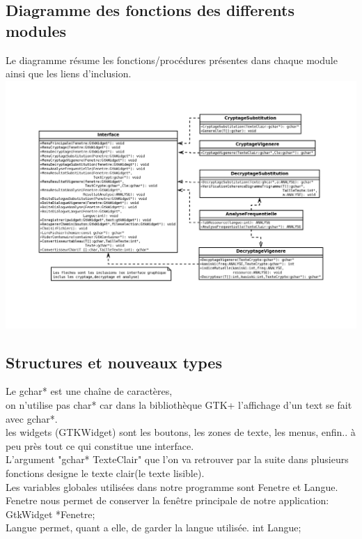 \documentclass[a4]{article}
\begin{document}
		\subsection{Diagramme des fonctions des differents modules}
								Le diagramme résume les fonctions/procédures présentes dans chaque module ainsi que les liens d'inclusion.\\

		\includegraphics[scale=0.8]{diaa.jpg}
		\subsection{Structures et nouveaux types}
		Le gchar* est une chaîne de caractères,\\ on n'utilise pas char* car dans la bibliothèque
		GTK+ l'affichage d'un text se fait avec gchar*.\\
		
		les widgets (GTKWidget) sont les boutons, les zones de texte, les menus, enfin.. à peu 
		près tout ce qui constitue une interface.\\
		
		L'argument "gchar* TexteClair" que l'on va retrouver par la suite dans plusieurs fonctions
		designe le texte clair(le texte lisible).\\
		
		Les variables globales utilisées dans notre programme sont Fenetre et Langue. Fenetre nous permet de
		conserver la fenêtre principale de notre application:\\
		GtkWidget *Fenetre; \\
		Langue permet, quant a elle, de garder la langue utilisée.
		int Langue;\\
		
\end{document}
